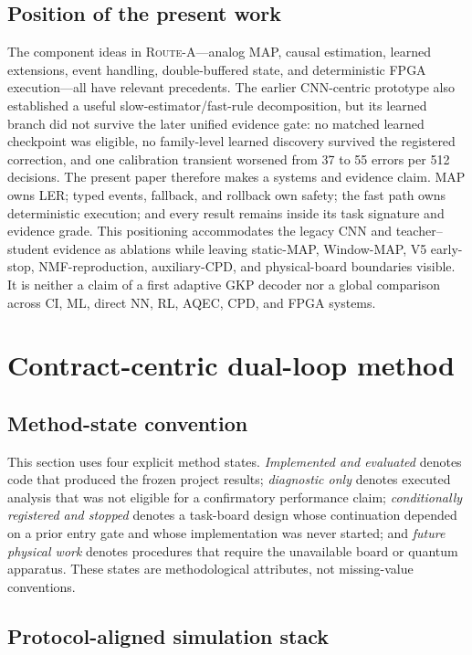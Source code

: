 \documentclass[11pt]{article}
\newcommand{\RouteA}{\textsc{Route-A}}
\begin{document}
\subsection{Position of the present work}

The component ideas in \RouteA{}---analog MAP, causal estimation, learned
extensions, event handling, double-buffered state, and deterministic FPGA
execution---all have relevant precedents.  The earlier CNN-centric prototype
also established a useful slow-estimator/fast-rule decomposition, but its
learned branch did not survive the later unified evidence gate: no matched
learned checkpoint was eligible, no family-level learned discovery survived
the registered correction, and one calibration transient worsened from 37 to
55 errors per 512 decisions.  The present paper therefore makes a systems and
evidence claim.  MAP owns LER; typed events, fallback, and rollback own safety;
the fast path owns deterministic execution; and every result remains inside its
task signature and evidence grade.  This positioning accommodates the legacy
CNN and teacher--student evidence as ablations while leaving static-MAP,
Window-MAP, V5 early-stop, NMF-reproduction, auxiliary-CPD, and physical-board
boundaries visible.  It is neither a claim of a first adaptive GKP decoder nor a
global comparison across CI, ML, direct NN, RL, AQEC, CPD, and FPGA systems.

\section{Contract-centric dual-loop method}
\label{sec:methods}

\subsection{Method-state convention}

This section uses four explicit method states.  \emph{Implemented and
evaluated} denotes code that produced the frozen project results;
\emph{diagnostic only} denotes executed analysis that was not eligible for a
confirmatory performance claim; \emph{conditionally registered and stopped}
denotes a task-board design whose continuation depended on a prior entry gate
and whose implementation was never started; and \emph{future physical work}
denotes procedures that require the unavailable board or quantum apparatus.
These states are methodological attributes, not missing-value conventions.

\subsection{Protocol-aligned simulation stack}
\end{document}
